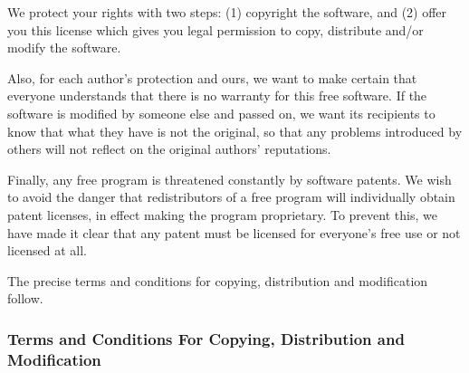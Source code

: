 We protect your rights with two steps: (1) copyright the software, and (2)
offer you this license which gives you legal permission to copy,
distribute and/or modify the software.

Also, for each author's protection and ours, we want to make certain that
everyone understands that there is no warranty for this free software.  If
the software is modified by someone else and passed on, we want its
recipients to know that what they have is not the original, so that any
problems introduced by others will not reflect on the original authors'
reputations.

Finally, any free program is threatened constantly by software patents.
We wish to avoid the danger that redistributors of a free program will
individually obtain patent licenses, in effect making the program
proprietary.  To prevent this, we have made it clear that any patent must
be licensed for everyone's free use or not licensed at all.

The precise terms and conditions for copying, distribution and
modification follow.

\subsubsection{Terms and Conditions For Copying, Distribution and
  Modification}

